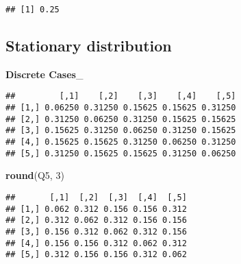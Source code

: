 \documentclass[
]{book}
\newenvironment{Shaded}{\begin{snugshade}}{\end{snugshade}}
\newcommand{\CommentTok}[1]{\textcolor[rgb]{0.56,0.35,0.01}{\textit{#1}}}
\newcommand{\ControlFlowTok}[1]{\textcolor[rgb]{0.13,0.29,0.53}{\textbf{#1}}}
\newcommand{\DecValTok}[1]{\textcolor[rgb]{0.00,0.00,0.81}{#1}}
\newcommand{\KeywordTok}[1]{\textcolor[rgb]{0.13,0.29,0.53}{\textbf{#1}}}
\newcommand{\NormalTok}[1]{#1}
\newcommand{\OperatorTok}[1]{\textcolor[rgb]{0.81,0.36,0.00}{\textbf{#1}}}
\newcommand{\StringTok}[1]{\textcolor[rgb]{0.31,0.60,0.02}{#1}}
\begin{document}
\begin{verbatim}
## [1] 0.25
\end{verbatim}

\hypertarget{stationary-distribution}{%
\subsection{Stationary distribution}\label{stationary-distribution}}

\textbf{Discrete Cases}\_

\begin{Shaded}
\end{Shaded}

\begin{verbatim}
##         [,1]    [,2]    [,3]    [,4]    [,5]
## [1,] 0.06250 0.31250 0.15625 0.15625 0.31250
## [2,] 0.31250 0.06250 0.31250 0.15625 0.15625
## [3,] 0.15625 0.31250 0.06250 0.31250 0.15625
## [4,] 0.15625 0.15625 0.31250 0.06250 0.31250
## [5,] 0.31250 0.15625 0.15625 0.31250 0.06250
\end{verbatim}

\begin{Shaded}
\begin{Highlighting}[]
\KeywordTok{round}\NormalTok{(Q5, }\DecValTok{3}\NormalTok{)}
\end{Highlighting}
\end{Shaded}

\begin{verbatim}
##       [,1]  [,2]  [,3]  [,4]  [,5]
## [1,] 0.062 0.312 0.156 0.156 0.312
## [2,] 0.312 0.062 0.312 0.156 0.156
## [3,] 0.156 0.312 0.062 0.312 0.156
## [4,] 0.156 0.156 0.312 0.062 0.312
## [5,] 0.312 0.156 0.156 0.312 0.062
\end{verbatim}

\begin{Shaded}
\end{Shaded}
\end{document}

